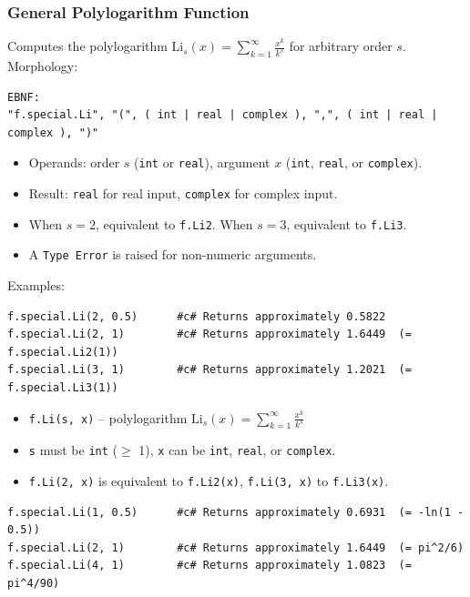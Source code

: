 \subsubsection{General Polylogarithm Function}
Computes the polylogarithm $\text{Li}_s(x) = \sum_{k=1}^{\infty} \frac{x^k}{k^s}$ for arbitrary order $s$. \\
Morphology:
\begin{verbatim}
EBNF:
"f.special.Li", "(", ( int | real | complex ), ",", ( int | real | complex ), ")"
\end{verbatim}
\begin{itemize}
\item Operands: order $s$ (\texttt{int} or \texttt{real}), argument $x$ (\texttt{int}, \texttt{real}, or \texttt{complex}).
\item Result: \texttt{real} for real input, \texttt{complex} for complex input.
\item When $s = 2$, equivalent to \texttt{f.Li2}. When $s = 3$, equivalent to \texttt{f.Li3}.
\item A \texttt{Type Error} is raised for non-numeric arguments.
\end{itemize}
Examples:
\begin{verbatim}
f.special.Li(2, 0.5)      #c# Returns approximately 0.5822
f.special.Li(2, 1)        #c# Returns approximately 1.6449  (= f.special.Li2(1))
f.special.Li(3, 1)        #c# Returns approximately 1.2021  (= f.special.Li3(1))
\end{verbatim}
\begin{itemize}
\item \texttt{f.Li(s, x)} -- polylogarithm $\text{Li}_s(x) = \sum_{k=1}^{\infty} \frac{x^k}{k^s}$
\item \texttt{s} must be \texttt{int} ($\geq$ 1), \texttt{x} can be \texttt{int}, \texttt{real}, or \texttt{complex}.
\item \texttt{f.Li(2, x)} is equivalent to \texttt{f.Li2(x)}, \texttt{f.Li(3, x)} to \texttt{f.Li3(x)}.
\end{itemize}
\begin{verbatim}
f.special.Li(1, 0.5)      #c# Returns approximately 0.6931  (= -ln(1 - 0.5))
f.special.Li(2, 1)        #c# Returns approximately 1.6449  (= pi^2/6)
f.special.Li(4, 1)        #c# Returns approximately 1.0823  (= pi^4/90)
\end{verbatim}

